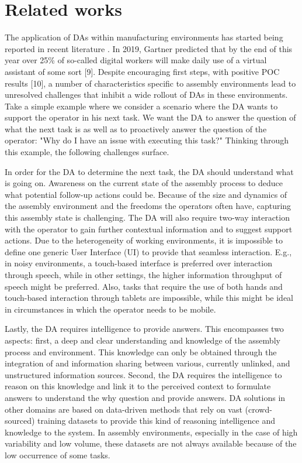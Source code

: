 \section{Related works}\label{sec:Literature}

The application of DAs within manufacturing environments has started being reported in recent literature \cite{rabelo2019CollaborativeSoftbotsEnhancing,traub2018FrameworkIllustratingDecisionmaking}. In 2019, Gartner predicted that by the end of this year over 25\% of so-called digital workers will make daily use of a virtual assistant of some sort [9]. Despite encouraging first steps, with positive POC results [10], a number of characteristics specific to assembly environments lead to unresolved challenges that inhibit a wide rollout of DAs in these environments. Take a simple example where we consider a scenario where the DA wants to support the operator in his next task. We want the DA to answer the question of what the next task is as well as to proactively answer the question of the operator: "Why do I have an issue with executing this task?" Thinking through this example, the following challenges surface.

In order for the DA to determine the next task, the DA should understand what is going on. Awareness on the current state of the assembly process to deduce what potential follow-up actions could be. Because of the size and dynamics of the assembly environment and the freedoms the operators often have, capturing this assembly state is challenging. The DA will also require two-way interaction with the operator to gain further contextual information and to suggest support actions. Due to the heterogeneity of working environments, it is impossible to define one generic User Interface (UI) to provide that seamless interaction. E.g., in noisy environments, a touch-based interface is preferred over interaction through speech, while in other settings, the higher information throughput of speech might be preferred. Also, tasks that require the use of both hands and touch-based interaction through tablets are impossible, while this might be ideal in circumstances in which the operator needs to be mobile.

Lastly, the DA requires intelligence to provide answers. This encompasses two aspects: first, a deep and clear understanding and knowledge of the assembly process and environment. This knowledge can only be obtained through the integration of and information sharing between various, currently unlinked, and unstructured information sources. Second, the DA requires the intelligence to reason on this knowledge and link it to the perceived context to formulate answers to understand the why question and provide answers. DA solutions in other domains are based on data-driven methods that rely on vast (crowd-sourced) training datasets to provide this kind of reasoning intelligence and knowledge to the system. In assembly environments, especially in the case of high variability and low volume, these datasets are not always available because of the low occurrence of some tasks.
